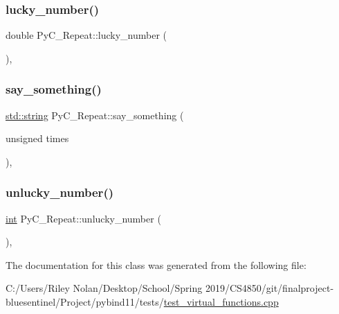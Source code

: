 \subsubsection{\texorpdfstring{lucky\_number()}{lucky\_number()}}
{\footnotesize\ttfamily double Py\+C\+\_\+\+Repeat\+::lucky\+\_\+number (\begin{DoxyParamCaption}{ }\end{DoxyParamCaption})\hspace{0.3cm}{\ttfamily [inline]}, {\ttfamily [override]}}

\mbox{\label{class_py_c___repeat_acb250c7797db787192db90f6ce3f7686}} 
\subsubsection{\texorpdfstring{say\_something()}{say\_something()}}
{\footnotesize\ttfamily \mbox{\hyperlink{_s_d_l__opengl__glext_8h_ab4ccfaa8ab0e1afaae94dc96ef52dde1}{std\+::string}} Py\+C\+\_\+\+Repeat\+::say\+\_\+something (\begin{DoxyParamCaption}\item[{unsigned}]{times }\end{DoxyParamCaption})\hspace{0.3cm}{\ttfamily [inline]}, {\ttfamily [override]}}

\mbox{\label{class_py_c___repeat_a3d8a581eb064d1900dce749193960a02}} 
\subsubsection{\texorpdfstring{unlucky\_number()}{unlucky\_number()}}
{\footnotesize\ttfamily \mbox{\hyperlink{warnings_8h_a74f207b5aa4ba51c3a2ad59b219a423b}{int}} Py\+C\+\_\+\+Repeat\+::unlucky\+\_\+number (\begin{DoxyParamCaption}{ }\end{DoxyParamCaption})\hspace{0.3cm}{\ttfamily [inline]}, {\ttfamily [override]}}



The documentation for this class was generated from the following file\+:\begin{DoxyCompactItemize}
\item 
C\+:/\+Users/\+Riley Nolan/\+Desktop/\+School/\+Spring 2019/\+C\+S4850/git/finalproject-\/bluesentinel/\+Project/pybind11/tests/\mbox{\hyperlink{test__virtual__functions_8cpp}{test\+\_\+virtual\+\_\+functions.\+cpp}}\end{DoxyCompactItemize}
